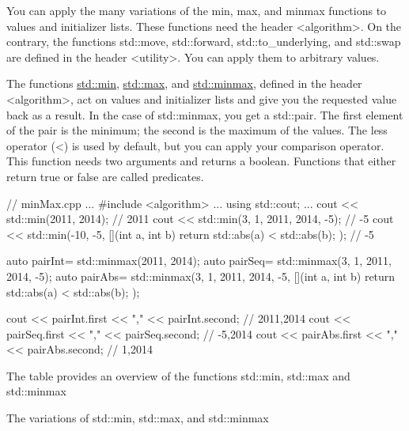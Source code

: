 You can apply the many variations of the min, max, and minmax functions to values and initializer lists. These functions need the header <algorithm>. On the contrary, the functions std::move, std::forward, std::to\_underlying, and std::swap are defined in the header <utility>. You can apply them to arbitrary values.


The functions \href{http://en.cppreference.com/w/cpp/algorithm/min}{std::min}, \href{http://en.cppreference.com/w/cpp/algorithm/max}{std::max}, and \href{http://en.cppreference.com/w/cpp/algorithm/minmax}{std::minmax}, defined in the header <algorithm>, act on values and initializer lists and give you the requested value back as a result. In the case of std::minmax, you get a std::pair. The first element of the pair is the minimum; the second is the maximum of the values. The less operator (<) is used by default, but you can apply your comparison operator. This function needs two arguments and returns a boolean. Functions that either return true or false are called predicates.


\begin{cpp}
// minMax.cpp
...
#include <algorithm>
...
using std::cout;
...
cout << std::min(2011, 2014); // 2011
cout << std::min({3, 1, 2011, 2014, -5}); // -5
cout << std::min(-10, -5, [](int a, int b)
                { return std::abs(a) < std::abs(b); }); // -5

auto pairInt= std::minmax(2011, 2014);
auto pairSeq= std::minmax({3, 1, 2011, 2014, -5});
auto pairAbs= std::minmax({3, 1, 2011, 2014, -5}, [](int a, int b)
                      { return std::abs(a) < std::abs(b); });

cout << pairInt.first << "," << pairInt.second; // 2011,2014
cout << pairSeq.first << "," << pairSeq.second; // -5,2014
cout << pairAbs.first << "," << pairAbs.second; // 1,2014
\end{cpp}

The table provides an overview of the functions std::min, std::max and std::minmax

\begin{center}
The variations of std::min, std::max, and std::minmax
\end{center}

